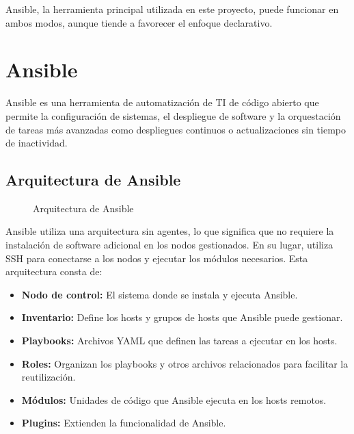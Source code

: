 \documentclass[12pt,a4paper]{report}
\begin{document}
\begin{notacaja}
Ansible, la herramienta principal utilizada en este proyecto, puede funcionar en ambos modos, aunque tiende a favorecer el enfoque declarativo.
\end{notacaja}

\section{Ansible}

Ansible es una herramienta de automatización de TI de código abierto que permite la configuración de sistemas, el despliegue de software y la orquestación de tareas más avanzadas como despliegues continuos o actualizaciones sin tiempo de inactividad.

\subsection{Arquitectura de Ansible}

\begin{figure}[H]
\centering
\caption{Arquitectura de Ansible}
\label{fig:ansible_architecture}
\end{figure}

Ansible utiliza una arquitectura sin agentes, lo que significa que no requiere la instalación de software adicional en los nodos gestionados. En su lugar, utiliza SSH para conectarse a los nodos y ejecutar los módulos necesarios. Esta arquitectura consta de:

\begin{itemize}
    \item[\textcolor{cientigo-blue}{\faCube}] \textbf{Nodo de control:} El sistema donde se instala y ejecuta Ansible.
    \item[\textcolor{cientigo-blue}{\faCube}] \textbf{Inventario:} Define los hosts y grupos de hosts que Ansible puede gestionar.
    \item[\textcolor{cientigo-blue}{\faCube}] \textbf{Playbooks:} Archivos YAML que definen las tareas a ejecutar en los hosts.
    \item[\textcolor{cientigo-blue}{\faCube}] \textbf{Roles:} Organizan los playbooks y otros archivos relacionados para facilitar la reutilización.
    \item[\textcolor{cientigo-blue}{\faCube}] \textbf{Módulos:} Unidades de código que Ansible ejecuta en los hosts remotos.
    \item[\textcolor{cientigo-blue}{\faCube}] \textbf{Plugins:} Extienden la funcionalidad de Ansible.
\end{itemize}
\end{document}
